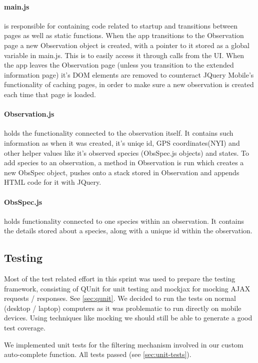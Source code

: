 \paragraph{main.js} is responsible for containing code related to startup and transitions between pages as well as static functions.
When the app transitions to the Observation page a new Observation object is created, with a pointer to it stored as a global variable in main.js.
This is to easily access it through calls from the UI. 
When the app leaves the Observation page (unless you transition to the extended information page) it's DOM elements are removed to counteract JQuery Mobile's functionality of caching pages, in order to make sure a new observation is created each time that page is loaded.

\paragraph{Observation.js} holds the functionality connected to the observation itself.
It contains such information as when it was created, it's uniqe id, GPS coordinates(NYI) and other helper values like it's observed species (ObsSpec.js objects) and states.
To add species to an observation, a method in Observation is run which creates a new ObsSpec object, pushes onto a stack stored in Observation and appends HTML code for it with JQuery.

\paragraph{ObsSpec.js} holds functionality connected to one species within an observation.
It contains the details stored about a species, along with a unique id within the observation.

\subsection{Testing}
Most of the test related effort in this sprint was used to prepare the
testing framework, consisting of QUnit for unit testing and mockjax for
mocking AJAX requests / responses. See \ref{sec:qunit}. We decided to run
the tests on normal (desktop / laptop) computers as it was problematic to
run directly on mobile devices. Using techniques like mocking we should
still be able to generate a good test coverage.

We implemented unit tests for the filtering mechanism involved in our custom
auto-complete function. All tests passed (see \ref{sec:unit-tests}).

